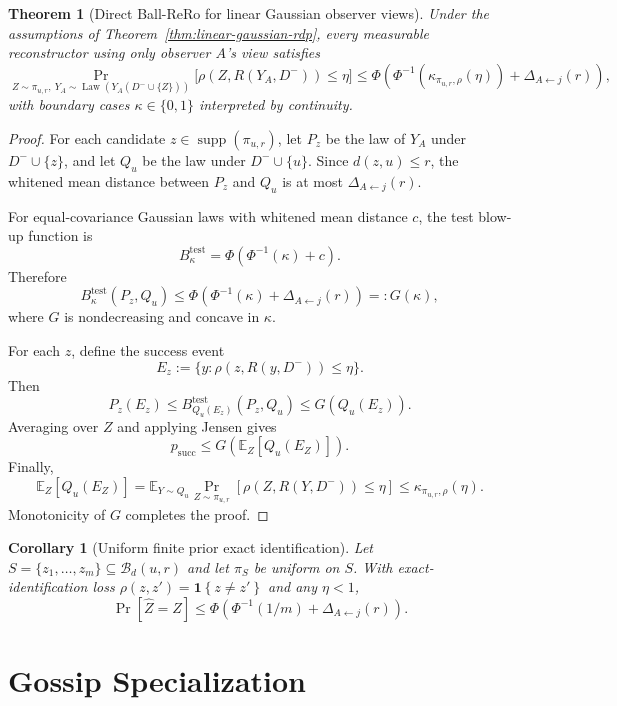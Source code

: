 \documentclass[conference,compsoc]{IEEEtran}
\newtheorem{theorem}{Theorem}
\newtheorem{corollary}{Corollary}
\DeclareMathOperator{\Law}{Law}
\DeclareMathOperator{\supp}{supp}
\newcommand{\cB}{\mathcal{B}}
\newcommand{\ind}[1]{\mathbf{1}\!\left\{#1\right\}}
\begin{document}
\begin{theorem}[Direct Ball-ReRo for linear Gaussian observer views]
\label{thm:linear-gaussian-rero}
Under the assumptions of Theorem~\ref{thm:linear-gaussian-rdp}, every measurable reconstructor using only observer $A$'s view satisfies
\[
\Pr_{Z\sim\pi_{u,r},\ Y_A\sim\Law(Y_A(D^-\cup\{Z\}))}
\bigl[\rho(Z,R(Y_A,D^-))\le\eta\bigr]
\le
\Phi\!\left(
\Phi^{-1}(\kappa_{\pi_{u,r},\rho}(\eta))+
\Delta_{A\leftarrow j}(r)
\right),
\]
with boundary cases $\kappa\in\{0,1\}$ interpreted by continuity.
\end{theorem}

\begin{proof}
For each candidate $z\in\supp(\pi_{u,r})$, let $P_z$ be the law of $Y_A$ under $D^-\cup\{z\}$, and let $Q_u$ be the law under $D^-\cup\{u\}$. Since $d(z,u)\le r$, the whitened mean distance between $P_z$ and $Q_u$ is at most $\Delta_{A\leftarrow j}(r)$.

For equal-covariance Gaussian laws with whitened mean distance $c$, the test blow-up function is
\[
B_\kappa^{\mathrm{test}}=
\Phi(\Phi^{-1}(\kappa)+c).
\]
Therefore
\[
B_\kappa^{\mathrm{test}}(P_z,Q_u)
\le
\Phi\!\left(\Phi^{-1}(\kappa)+\Delta_{A\leftarrow j}(r)\right)
=:G(\kappa),
\]
where $G$ is nondecreasing and concave in $\kappa$.

For each $z$, define the success event
\[
E_z:=\{y:\rho(z,R(y,D^-))\le\eta\}.
\]
Then
\[
P_z(E_z)\le B_{Q_u(E_z)}^{\mathrm{test}}(P_z,Q_u)
\le G(Q_u(E_z)).
\]
Averaging over $Z$ and applying Jensen gives
\[
p_{\mathrm{succ}}
\le
G\left(\mathbb E_Z[Q_u(E_Z)]\right).
\]
Finally,
\[
\mathbb E_Z[Q_u(E_Z)]
=
\mathbb E_{Y\sim Q_u}
\Pr_{Z\sim\pi_{u,r}}[\rho(Z,R(Y,D^-))\le\eta]
\le
\kappa_{\pi_{u,r},\rho}(\eta).
\]
Monotonicity of $G$ completes the proof.
\end{proof}

\begin{corollary}[Uniform finite prior exact identification]
\label{cor:finite-direct}
Let $S=\{z_1,\ldots,z_m\}\subseteq\cB_d(u,r)$ and let $\pi_S$ be uniform on $S$. With exact-identification loss $\rho(z,z')=\ind{z\ne z'}$ and any $\eta<1$,
\[
\Pr[\widehat Z=Z]
\le
\Phi\!\left(\Phi^{-1}(1/m)+\Delta_{A\leftarrow j}(r)\right).
\]
\end{corollary}

\section{Gossip Specialization}
\label{sec:gossip}
\end{document}
